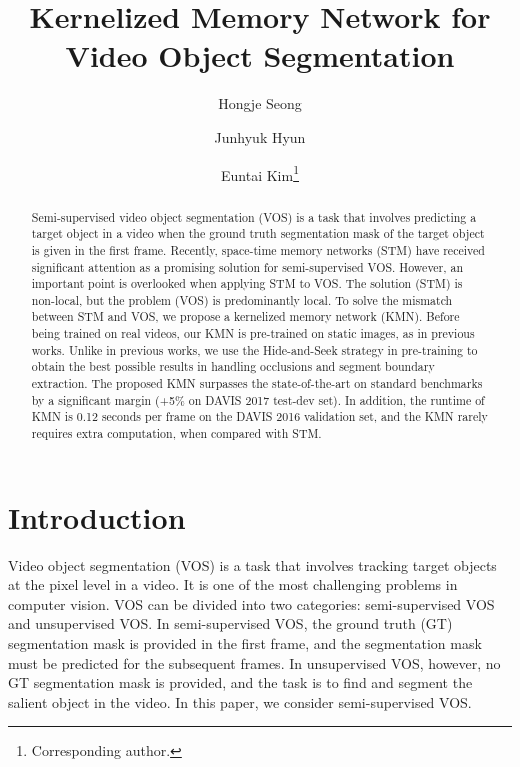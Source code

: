 \documentclass[runningheads]{llncs}
\begin{document}
\pagestyle{headings}
\mainmatter
\def\ECCVSubNumber{4152}  

\title{Kernelized Memory Network for Video Object Segmentation} 

\begin{comment}
\titlerunning{ECCV-20 submission ID \ECCVSubNumber} 
\authorrunning{ECCV-20 submission ID \ECCVSubNumber} 
\author{Anonymous ECCV submission}
\institute{Paper ID \ECCVSubNumber}
\end{comment}


\author{Hongje Seong \and Junhyuk Hyun \and
Euntai Kim\thanks{Corresponding author.}} 
\maketitle

\begin{abstract}
Semi-supervised video object segmentation (VOS) is a task that involves predicting a target object in a video when the ground truth segmentation mask of the target object is given in the first frame. Recently, space-time memory networks (STM) have received significant attention as a promising solution for semi-supervised VOS. However, an important point is overlooked when applying STM to VOS. The solution (STM) is non-local, but the problem (VOS) is predominantly local. To solve the mismatch between STM and VOS, we propose a kernelized memory network (KMN). Before being trained on real videos, our KMN is pre-trained on static images, as in previous works. Unlike in previous works, we use the Hide-and-Seek strategy in pre-training to obtain the best possible results in handling occlusions and segment boundary extraction.
The proposed KMN surpasses the state-of-the-art on standard benchmarks by a significant margin (+5\% on DAVIS 2017 test-dev set).
In addition, the runtime of KMN is 0.12 seconds per frame on the DAVIS 2016 validation set, and the KMN rarely requires extra computation, when compared with STM.
\end{abstract}


\section{Introduction}
\label{s1}
Video object segmentation (VOS) is a task that involves tracking target objects at the pixel level in a video. It is one of the most challenging problems in computer vision. VOS can be divided into two categories: semi-supervised VOS and unsupervised VOS. In semi-supervised VOS, the ground truth (GT) segmentation mask is provided in the first frame, and the segmentation mask must be predicted for the subsequent frames. In unsupervised VOS, however, no GT segmentation mask is provided, and the task is to find and segment the salient object in the video. In this paper, we consider semi-supervised VOS.
\end{document}
